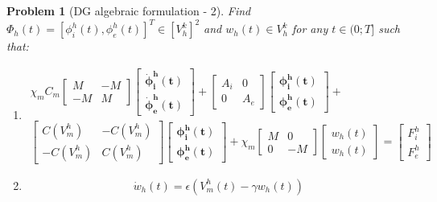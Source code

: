 \documentclass[a4paper,11pt]{article}
\newtheorem{problem}{Problem}
\begin{document}
 \begin{problem}[DG algebraic formulation - 2] \label{block_matrix}
 Find $\Phi_h(t)=[\phi_i^h(t),\phi_e^h(t)]^T \in [V_h^k]^2$ and $w_h(t) \in V_h^k$ for any $t \in (0;T]$ such that:
 \begin{enumerate}[label=\Roman*]
 \item
 \begin{equation*}
 \begin{gathered}
 \chi_mC_m \begin{bmatrix}M &-M \\ -M & M \end{bmatrix}
	\begin{bmatrix}\bm{\dot{\phi}_i^h(t)} \\ \bm{\dot{\phi}_e^h(t)} \end{bmatrix}
	 + \begin{bmatrix}A_i & 0 \\ 0 & A_e \end{bmatrix}
	 \begin{bmatrix}\bm{\phi_i^h(t)} \\ \bm{\phi_e^h(t)} \end{bmatrix} +\\
	   \begin{bmatrix}C(V_m^h) & -C(V_m^h) \\ -C(V_m^h) & C(V_m^h) \end{bmatrix} 
	   \begin{bmatrix} \bm{\phi_i^h(t)} \\ \bm{\phi_e^h(t)}  \end{bmatrix} 
	   +\chi_m \begin{bmatrix}M & 0 \\ 0 & -M \end{bmatrix} 
	   	\begin{bmatrix}w_h(t) \\ w_h(t) \end{bmatrix} = 
	   	\begin{bmatrix} F_i^h \\ F_e^h\end{bmatrix}
 \end{gathered}
 \end{equation*}
 \item
 \begin{equation*}
	   \dot{w}_h(t)=\epsilon (V_m^h(t)-\gamma w_h(t))
\end{equation*}
\end{enumerate}
\end{problem}
\vspace{5mm}
\end{document}
